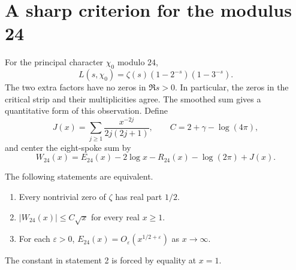 \section{A sharp criterion for the modulus 24}\label{sec:explicit}
For the principal character $\chi_0$ modulo $24$,
\[
 L(s,\chi_0)=\zeta(s)(1-2^{-s})(1-3^{-s}).
\]
The two extra factors have no zeros in $\Re s>0$. In particular, the
zeros in the critical strip and their multiplicities agree. The
smoothed sum gives a quantitative form of this observation. Define
\begin{equation}
 J(x)=\sum_{j\geq1}\frac{x^{-2j}}{2j(2j+1)},\qquad
 C=2+\gamma-\log(4\pi), \label{eq:J}
\end{equation}
and center the eight-spoke sum by
\[
 W_{24}(x)=E_{24}(x)-2\log x-R_{24}(x)-\log(2\pi)+J(x).
\]
\begin{theorem}\label{thm:rh}
The following statements are equivalent.
\begin{enumerate}
\item Every nontrivial zero of $\zeta$ has real part $1/2$.
\item $|W_{24}(x)|\leq C\sqrt{x}$ for every real $x\geq1$.
\item For each $\varepsilon>0$,
$E_{24}(x)=O_\varepsilon(x^{1/2+\varepsilon})$ as $x\to\infty$.
\end{enumerate}
The constant in statement 2 is forced by equality at $x=1$.
\end{theorem}

